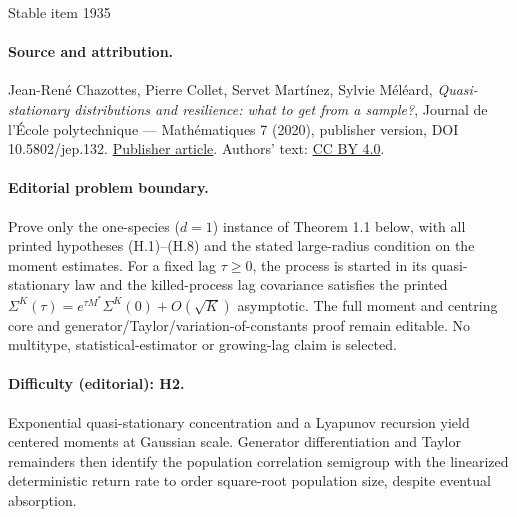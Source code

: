 \documentclass[11pt]{article}
\begin{document}
\begin{center}{\Large Stable item 1935}\end{center}
\paragraph{Source and attribution.}
Jean-René Chazottes, Pierre Collet, Servet Martínez, Sylvie Méléard, \emph{Quasi-stationary distributions and resilience: what to get from a sample?}, Journal de l’École polytechnique — Mathématiques 7 (2020), publisher version, DOI 10.5802/jep.132. \href{https://jep.centre-mersenne.org/articles/10.5802/jep.132/}{Publisher article}. Authors' text: \href{https://creativecommons.org/licenses/by/4.0/}{CC BY 4.0}.
\paragraph{Editorial problem boundary.}
Prove only the one-species (\(d=1\)) instance of Theorem 1.1 below, with all printed hypotheses (H.1)--(H.8) and the stated large-radius condition on the moment estimates. For a fixed lag \(\tau\ge0\), the process is started in its quasi-stationary law and the killed-process lag covariance satisfies the printed \(\Sigma^K(\tau)=e^{\tau M^*}\Sigma^K(0)+O(\sqrt K)\) asymptotic. The full moment and centring core and generator/Taylor/variation-of-constants proof remain editable. No multitype, statistical-estimator or growing-lag claim is selected.
\paragraph{Difficulty (editorial): H2.}
Exponential quasi-stationary concentration and a Lyapunov recursion yield centered moments at Gaussian scale. Generator differentiation and Taylor remainders then identify the population correlation semigroup with the linearized deterministic return rate to order square-root population size, despite eventual absorption.
\end{document}
